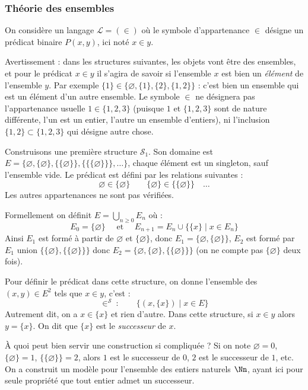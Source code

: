 \documentclass[11pt,class=report,crop=false]{standalone}
\begin{document}
\subsubsection{Théorie des ensembles}


On considère un langage $\mathcal{L} = (\in)$ où le symbole d'appartenance \og{}$\in$\fg{} désigne un prédicat binaire $P(x,y)$, ici noté $x \in y$.

Avertissement : dans les structures suivantes, les objets vont être des ensembles, et pour le prédicat $x \in y$ il s'agira de savoir si l'ensemble $x$ est bien un \emph{élément} de l'ensemble $y$. Par exemple $\{1\} \in \{ \varnothing, \{1\}, \{2\}, \{ 1,2\} \}$ : c'est bien un ensemble qui est un élément d'un autre ensemble.
Le symbole $\in$ ne désignera pas l'appartenance usuelle $1 \in \{1,2,3\}$ (puisque $1$ et $\{1,2,3\}$ sont de nature différente, l'un est un entier, l'autre un ensemble d'entiers), ni l'inclusion $\{1,2\} \subset \{1,2,3\}$ qui désigne autre chose.


Construisons une première structure $\mathcal{S}_1$.
Son domaine est $E = \{ \varnothing, \{ \varnothing \}, \{\{\varnothing \}\}, \{\{\{\varnothing \}\}\}, \ldots \}$, chaque élément est un singleton, sauf l'ensemble vide.
Le prédicat est défini par les relations suivantes :
\[
\varnothing \in \{ \varnothing \} \qquad \{ \varnothing \} \in \{\{\varnothing \}\} \quad \ldots
\]
Les autres appartenances ne sont pas vérifiées.

Formellement on définit $E = \bigcup_{n\ge0} E_n$ où :
\[
E_0 = \{\varnothing\} \quad \text{ et } \quad E_{n+1} = E_n \cup \big\{ \{ x \} \mid x \in E_n
\big\} 
\]
Ainsi $E_1$ est formé à partir de $\varnothing$ et $\{ \varnothing\}$, donc $E_1 = \{ \varnothing, \{ \varnothing\} \}$, $E_2$ est formé par $E_1$ union $\{ \{\varnothing\}, \{\{ \varnothing \}\} \}$ donc $E_2 = \{ \varnothing, \{ \varnothing \}, \{\{\varnothing \}\} \}$ (on ne compte pas $\{ \varnothing \}$ deux fois).

Pour définir le prédicat dans cette structure, on donne l'ensemble des $(x,y) \in E^2$ tels que $x \in y$, c'est :
\[ 
\in^{\mathcal{S}} \ : \qquad \big\{ (x,\{x\}) \mid x \in E \big\}
\]
Autrement dit, on a $x \in \{ x \}$ et rien d'autre.
Dans cette structure, si $x \in y$ alors $y = \{ x\}$. On dit que $\{x\}$ est le \emph{successeur} de $x$.

À  quoi peut bien servir une construction si compliquée ?
Si on note $\varnothing = 0$, $\{ \varnothing \} = 1$, $\{\{ \varnothing \}\} = 2$, alors
$1$ est le successeur de $0$, $2$ est le successeur de $1$, etc. On a construit un modèle pour l'ensemble des entiers naturels $\Nn$, ayant ici pour seule propriété que tout entier admet un successeur.
\end{document}
